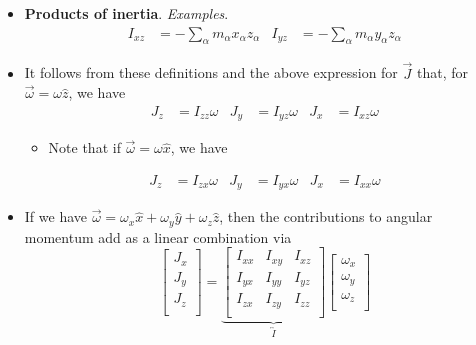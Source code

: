 \documentclass[../notes.tex]{subfiles}
\begin{document}
\begin{itemize}
\begin{itemize}
    \end{itemize}
    \item \textbf{Products of inertia}. \emph{Examples}.
    \begin{align*}
        I_{xz} &= -\sum_\alpha m_\alpha x_\alpha z_\alpha&
        I_{yz} &= -\sum_\alpha m_\alpha y_\alpha z_\alpha
    \end{align*}
    \item It follows from these definitions and the above expression for $\vec{J}$ that, for $\vec{\omega}=\omega\hat{z}$, we have
    \begin{align*}
        J_z &= I_{zz}\omega&
        J_y &= I_{yz}\omega&
        J_x &= I_{xz}\omega
    \end{align*}
    \begin{itemize}
        \item Note that if $\vec{\omega}=\omega\hat{x}$, we have
    \end{itemize}
    \begin{align*}
        J_z &= I_{zx}\omega&
        J_y &= I_{yx}\omega&
        J_x &= I_{xx}\omega
    \end{align*}
    \item If we have $\vec{\omega}=\omega_x\hat{x}+\omega_y\hat{y}+\omega_z\hat{z}$, then the contributions to angular momentum add as a linear combination via
    \begin{equation*}
        \begin{bmatrix}
            J_x\\
            J_y\\
            J_z\\
        \end{bmatrix}
        = \underbrace{
            \begin{bmatrix}
                I_{xx} & I_{xy} & I_{xz}\\
                I_{yx} & I_{yy} & I_{yz}\\
                I_{zx} & I_{zy} & I_{zz}\\
            \end{bmatrix}
        }_{\overleftrightarrow{I}}
        \begin{bmatrix}
            \omega_x\\
            \omega_y\\
            \omega_z\\
        \end{bmatrix}
    \end{equation*}
    \begin{itemize}

\end{itemize}
\end{itemize}
\end{document}
